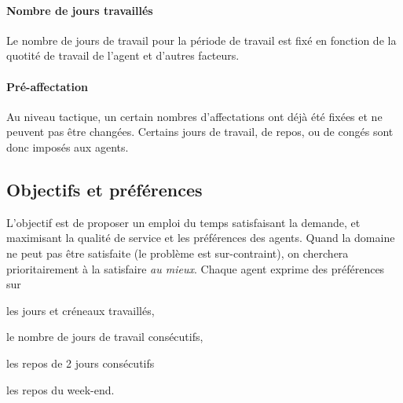 \documentclass[a4paper]{article}       %
\begin{document}
\paragraph{Nombre de jours travaillés}
Le nombre de jours de travail pour la période de travail est fixé en fonction de la quotité de travail de l'agent et d'autres facteurs. 

\paragraph{Pré-affectation}
Au niveau tactique, un certain nombres d'affectations ont déjà été fixées et ne peuvent pas être changées.
Certains jours de travail, de repos, ou de congés sont donc imposés aux agents.


\subsection{Objectifs et préférences}

L'objectif est de proposer un emploi du temps satisfaisant la demande, et maximisant la qualité de service et les préférences des agents.
Quand la domaine ne peut pas être satisfaite (le problème est sur-contraint), on cherchera prioritairement à la satisfaire \emph{au mieux}. 
Chaque agent exprime des préférences sur
\begin{inparaenum}[a)]
\item les jours et créneaux travaillés,
\item le nombre de jours de travail consécutifs,
\item les repos de 2 jours consécutifs
\item les repos du week-end.
\end{inparaenum}




       
\end{document}
